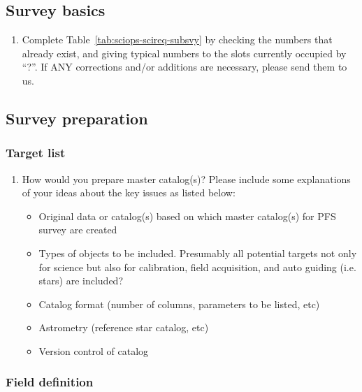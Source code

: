 \documentclass[a4paper,notitlepage]{article}
\begin{document}
\subsection{Survey basics}

\begin{enumerate}
  \item[\cols{a}] Complete Table~\ref{tab:sciops-scireq-subsvy} by
           checking the numbers that already exist, and giving
           typical numbers to the slots currently occupied by
           ``?''. If ANY corrections and/or additions are necessary,
           please send them to us.
\end{enumerate}

\subsection{Survey preparation}

\subsubsection{Target list}

\begin{enumerate}
 \item[\cols{a}] How would you prepare master catalog(s)?  Please
          include some explanations of your ideas about the key
          issues as listed below:
          \begin{itemize}
           \item Original data or catalog(s) based on which master
             catalog(s) for PFS survey are created
           \item Types of objects to be included. Presumably all
             potential targets not only for science but also for
             calibration, field acquisition, and auto guiding
             (i.e. stars) are included?
           \item Catalog format (number of columns, parameters to be
             listed, etc)
           \item Astrometry (reference star catalog, etc)
           \item Version control of catalog
          \end{itemize}
\end{enumerate}

\subsubsection{Field definition}
\end{document}
